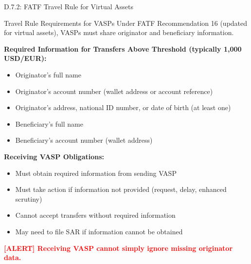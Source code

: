 \documentclass[11pt,a4paper]{beamer}
\newcommand{\redflag}[1]{\textcolor{red}{\textbf{[ALERT] #1}}}
\begin{document}
\begin{frame}{D.7.2: FATF Travel Rule for Virtual Assets}
	\begin{block}{Travel Rule Requirements for VASPs}
		Under FATF Recommendation 16 (updated for virtual assets), VASPs must share originator and beneficiary information.
	\end{block}
	\textbf{Required Information for Transfers Above Threshold (typically 1,000 USD/EUR):}
	\begin{itemize}
		\item Originator's full name
		\item Originator's account number (wallet address or account reference)
		\item Originator's address, national ID number, or date of birth (at least one)
		\item Beneficiary's full name
		\item Beneficiary's account number (wallet address)
	\end{itemize}
	\textbf{Receiving VASP Obligations:}
	\begin{itemize}
		\item Must obtain required information from sending VASP
		\item Must take action if information not provided (request, delay, enhanced scrutiny)
		\item Cannot accept transfers without required information
		\item May need to file SAR if information cannot be obtained
	\end{itemize}
	\redflag{Receiving VASP cannot simply ignore missing originator data.}
\end{frame}
\end{document}

